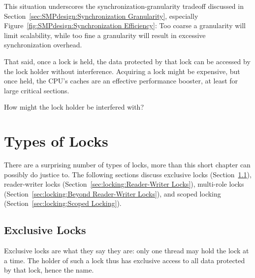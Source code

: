 This situation underscores the synchronization-granularity
tradeoff discussed in Section~\ref{sec:SMPdesign:Synchronization Granularity},
especially Figure~\ref{fig:SMPdesign:Synchronization Efficiency}:
Too coarse a granularity will limit scalability, while too fine a
granularity will result in excessive synchronization overhead.

That said, once a lock is held, the data protected by that lock can
be accessed by the lock holder without interference.
Acquiring a lock might be expensive, but once held, the CPU's caches
are an effective performance booster, at least for large critical sections.

\QuickQuiz{}
	How might the lock holder be interfered with?
 \QuickQuizEnd

\section{Types of Locks}
\label{sec:locking:Types of Locks}

There are a surprising number of types of locks, more than this
short chapter can possibly do justice to.
The following sections discuss
exclusive locks (Section~\ref{sec:locking:Exclusive Locks}),
reader-writer locks (Section~\ref{sec:locking:Reader-Writer Locks}),
multi-role locks (Section~\ref{sec:locking:Beyond Reader-Writer Locks}),
and scoped locking (Section~\ref{sec:locking:Scoped Locking}).

\subsection{Exclusive Locks}
\label{sec:locking:Exclusive Locks}

Exclusive locks are what they say they are: only one thread may hold
the lock at a time.
The holder of such a lock thus has exclusive access to all data protected
by that lock, hence the name.

